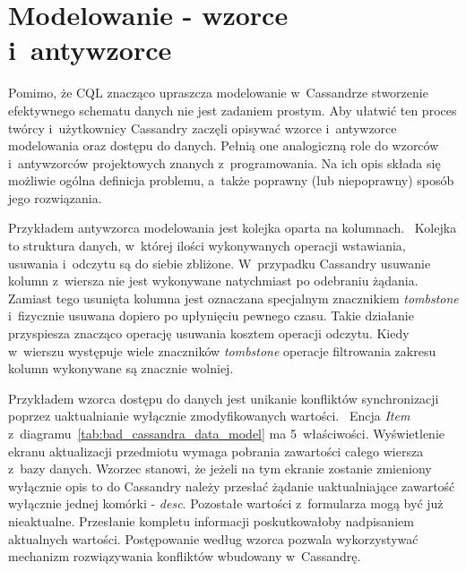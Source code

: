 \section{Modelowanie - wzorce i~antywzorce}

Pomimo, że CQL znacząco upraszcza modelowanie w~Cassandrze stworzenie efektywnego schematu danych nie jest zadaniem prostym. Aby ułatwić ten proces twórcy i~użytkownicy Cassandry zaczęli opisywać wzorce i~antywzorce modelowania oraz dostępu do danych. Pełnią one analogiczną role do wzorców i~antywzorców projektowych znanych z~programowania. Na ich opis składa się możliwie ogólna definicja problemu, a~także poprawny (lub niepoprawny) sposób jego rozwiązania. 

Przykładem antywzorca modelowania jest kolejka oparta na kolumnach.~\cite{cassandra_queue_antipattern} Kolejka to struktura danych, w~której ilości wykonywanych operacji wstawiania, usuwania i~odczytu są do siebie zbliżone. W~przypadku Cassandry usuwanie kolumn z~wiersza nie jest wykonywane natychmiast po odebraniu żądania. Zamiast tego usunięta kolumna jest oznaczana specjalnym znacznikiem \emph{tombstone} i~fizycznie usuwana dopiero po upłynięciu pewnego czasu. Takie działanie przyspiesza znacząco operację usuwania kosztem operacji odczytu. Kiedy w~wierszu występuje wiele znaczników \emph{tombstone} operacje filtrowania zakresu kolumn wykonywane są znacznie wolniej.

Przykładem wzorca dostępu do danych jest unikanie konfliktów synchronizacji poprzez uaktualnianie wyłącznie zmodyfikowanych wartości.~\cite{cassandra_concepts_patterns_antipatterns} Encja \emph{Item} z~diagramu~\ref{tab:bad_cassandra_data_model} ma 5~właściwości. Wyświetlenie ekranu aktualizacji przedmiotu wymaga pobrania zawartości całego wiersza z~bazy danych. Wzorzec stanowi, że jeżeli na tym ekranie zostanie zmieniony wyłącznie opis to do Cassandry należy przesłać żądanie uaktualniające zawartość wyłącznie jednej komórki - \emph{desc}. Pozostałe wartości z~formularza mogą być już nieaktualne. Przesłanie kompletu informacji poskutkowałoby nadpisaniem aktualnych wartości. Postępowanie według wzorca pozwala wykorzystywać mechanizm rozwiązywania konfliktów wbudowany w~Cassandrę.

